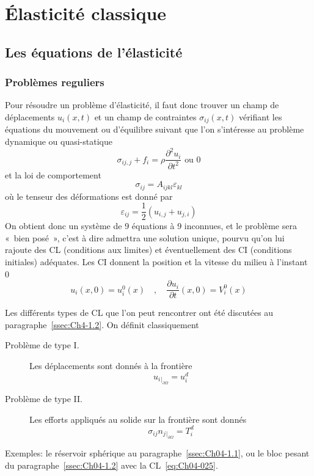 \chapter{Élasticité classique}
\section{Les équations de l'élasticité}
\subsection{Problèmes reguliers}
Pour résoudre un problème d'élasticité, il faut donc trouver un champ de déplacements $u_i\left( x,t \right)$ et un champ de contraintes $\sigma_{ij}\left( x,t \right)$ vérifiant les équations du mouvement ou d'équilibre suivant que l'on s'intéresse au problème dynamique ou quasi-statique
\begin{equation}
    \sigma_{ij,j} + f_i = \rho \frac{\partial^2 u_i}{\partial t^2} \text{ ou } 0
    \label{eq:Ch06-001}
\end{equation}
et la loi de comportement
\begin{equation}
    \sigma_{ij} = A_{ijkl} \varepsilon_{kl}
    \label{eq:Ch06-002}
\end{equation}
où le tenseur des déformations est donné par
\begin{equation}
    \varepsilon_{ij} = \frac{1}{2} \left( u_{i,j} + u_{j,i} \right)
    \label{eq:Ch06-003}
\end{equation}
On obtient donc un système de 9 équations à 9 inconnues, et le problème sera «~bien posé~», c'est à dire admettra une solution unique, pourvu qu'on lui rajoute des CL (conditions aux limites) et éventuellement des CI (conditions initiales) adéquates.
Les CI donnent la position et la vitesse du milieu à l'instant 0
\begin{equation}
    u_i \left( x,0 \right) = u_{i}^0 (x) \quad, \quad \frac{\partial u_i}{\partial t} \left( x,0 \right) = V_i^0 \left( x \right)
    \label{eq:Ch06-004}
\end{equation}

Les différents types de CL que l'on peut rencontrer ont été discutées au paragraphe~\ref{ssec:Ch4-1.2}.
On définit classiquement
\begin{description}
    \item[Problème de type I.] Les déplacements sont donnés à la frontière
        \begin{equation}
            u_i{}_{|_{\partial \Omega}} = u_i^d
            \label{eq:Ch06-005}
        \end{equation}
    \item[Problème de type II.] Les efforts appliqués au solide sur la frontière sont donnés
        \begin{equation}
            \sigma_{ij} n_j{}_{|_{\partial \Omega}} = T_i^d
            \label{eq:Ch06-006}
        \end{equation}
\end{description}
Exemples: le réservoir sphérique au paragraphe~\ref{ssec:Ch04-1.1}, ou le bloc pesant du paragraphe~\ref{ssec:Ch04-1.2} avec la CL~\eqref{eq:Ch04-025}.

